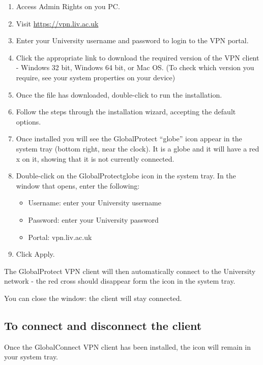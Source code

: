 \documentclass[
]{book}
\providecommand{\tightlist}{%
  \setlength{\itemsep}{0pt}\setlength{\parskip}{0pt}}
\begin{document}
\begin{enumerate}
\def\labelenumi{\arabic{enumi})}
\item
  Access Admin Rights on you PC.
\item
  Visit \url{https://vpn.liv.ac.uk}
\item
  Enter your University username and password to login to the VPN portal.
\item
  Click the appropriate link to download the required version of the VPN client - Windows 32 bit, Windows 64 bit, or Mac OS.
  (To check which version you require, see your system properties on your device)
\item
  Once the file has downloaded, double-click to run the installation.
\item
  Follow the steps through the installation wizard, accepting the default options.
\item
  Once installed you will see the GlobalProtect ``globe'' icon appear in the system tray (bottom right, near the clock).
  It is a globe and it will have a red x on it, showing that it is not currently connected.
\item
  Double-click on the GlobalProtectglobe icon in the system tray. In the window that opens, enter the following:

  \begin{itemize}
  \tightlist
  \item
    Username: enter your University username
  \item
    Password: enter your University password
  \item
    Portal: vpn.liv.ac.uk
  \end{itemize}
\item
  Click Apply.
\end{enumerate}

The GlobalProtect VPN client will then automatically connect to the University network - the red cross should disappear form the icon in the system tray.

You can close the window: the client will stay connected.

\hypertarget{to-connect-and-disconnect-the-client}{%
\subsection{To connect and disconnect the client}\label{to-connect-and-disconnect-the-client}}

Once the GlobalConnect VPN client has been installed, the icon will remain in your system tray.
\end{document}
